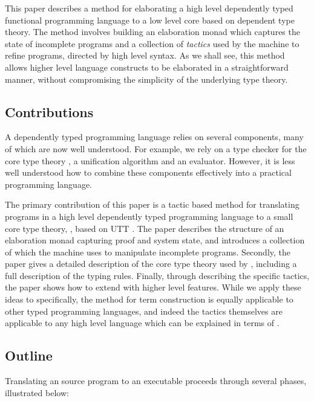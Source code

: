 This paper describes a method for elaborating a high level dependently typed
functional programming language to a low level core based on dependent
type theory.  The method involves building an elaboration monad which captures
the state of incomplete programs and a collection of \emph{tactics} used by the
machine to refine programs, directed by high level syntax.  As we shall see,
this method allows higher level language constructs to be elaborated in a
straightforward manner, without compromising the simplicity of the underlying
type theory.

\subsection{Contributions}

A dependently typed programming language relies on several components, many of
which are now well understood. For example, we rely on a type checker for
the core type theory \cite{Chapman2005epigram,loh2010tutorial}, a
unification algorithm \cite{Miller1992} and an evaluator. However, it is less
well understood how to combine these components effectively into a practical
programming language. 

The primary contribution of this paper is a tactic based method for translating
programs in a high level dependently typed programming language to a small core
type theory, \TT{}, based on UTT \cite{luo1994}. The paper describes the
structure of an elaboration monad capturing proof and system state, and
introduces a collection of  which the machine uses to
manipulate incomplete programs.  Secondly, the paper gives a detailed
description of the core type theory used by \Idris{}, including a full
description of the typing rules.  Finally, through describing the specific
tactics, the paper shows how to extend \Idris{} with higher level features.
While we apply these ideas to \Idris{} specifically, the method for term
construction is equally applicable to other typed programming languages, and
indeed the tactics themselves are applicable to any high level language which
can be explained in terms of \TT{}.

\subsection{Outline}

Translating an \Idris{} source program to an executable proceeds through several
phases, illustrated below:

\begin{center}
\end{center}

